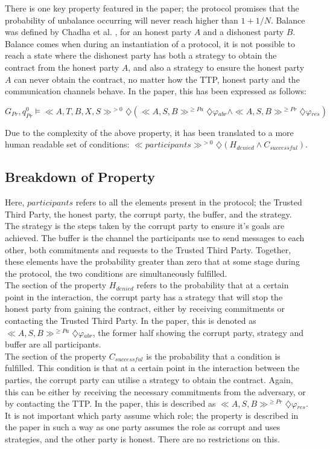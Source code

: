 \documentclass{l4proj}
\begin{document}
There is one key property featured in the paper; the protocol promises that the probability of unbalance occurring will never reach higher than $1+1/N$.
Balance was defined by Chadha et al. \cite{chadha2001inductive}, for an honest party $A$ and a dishonest party $B$. Balance comes when during an instantiation of a protocol, it is not possible to reach a state where the dishonest party has both a strategy to obtain the contract from the honest party $A$, and also a strategy to ensure the honest party $A$ can never obtain the contract, no matter how the TTP, honest party and the communication channels behave. In the paper,  this has been expressed as follows:\\

\centerline{$ G{_{Pr}},q_{Pr}^{0}\models  \ll A, T, B, X, S \gg ^{>0} \diamondsuit (\ll A, S, B \gg^{\ge Pa} \diamondsuit \varphi{_{abr}}  \wedge \ll A, S, B \gg^{\ge Pr} \diamondsuit \varphi{_{res}}) $}

Due to the complexity of the above property, it has been translated to a more human readable set of conditions:
$\ll participants \gg ^{>0} \diamondsuit (H_{denied}  \wedge C_{successful})$.


\subsection{Breakdown of Property}
Here, $participants$ refers to all the elements present in the protocol; the Trusted Third Party, the honest party, the corrupt party, the buffer, and the strategy. The strategy is the steps taken by the corrupt party to ensure it's goals are achieved. The buffer is the channel the participants use to send messages to each other, both commitments and requests to the Trusted Third Party. Together, these elements have the probability greater than zero that at some stage during the protocol, the two conditions are simultaneously fulfilled.\\
The section of the property $H_{denied}$ refers to the probability that at a certain point in the interaction, the corrupt party has a strategy that will stop the honest party from gaining the contract, either by receiving commitments or contacting the Trusted Third Party. In the paper, this is denoted as  $\ll A, S, B \gg^{\ge Pa} \diamondsuit \varphi{_{abr}}$, the former half showing the corrupt party, strategy and buffer are all participants. \\
The section of the property $C_{successful}$ is the probability that a condition is fulfilled. This condition is that at a certain point in the interaction between the parties, the corrupt party can utilise a strategy to obtain the contract. Again, this can be either by receiving the necessary commitments from the adversary, or by contacting the TTP. In the paper, this is described as $\ll A, S, B \gg^{\ge Pr} \diamondsuit \varphi{_{res}}$. \\
It is not important which party assume which role; the property is described in the paper in such a way as one party assumes the role as corrupt and uses strategies, and the other party is honest. There are no restrictions on this.
\end{document}

